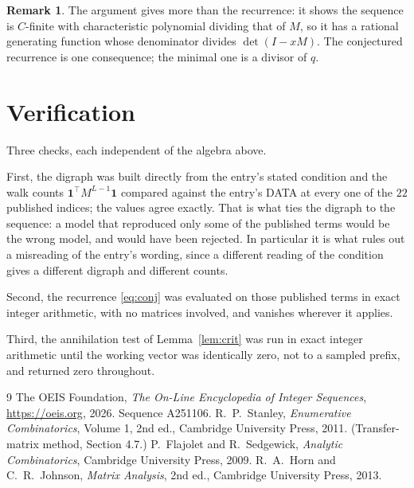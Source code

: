 \documentclass[11pt,a4paper]{article}
\theoremstyle{plain}
\theoremstyle{definition}
\newtheorem{remark}[theorem]{Remark}
\begin{document}
\begin{remark}
The argument gives more than the recurrence: it shows the sequence is $C$-finite with
characteristic polynomial dividing that of $M$, so it has a rational generating function
whose denominator divides $\det(I-xM)$. The conjectured recurrence is one consequence; the
minimal one is a divisor of $q$.
\end{remark}

\section{Verification}

Three checks, each independent of the algebra above.

First, the digraph was built directly from the entry's stated condition and the walk counts
$\mathbf{1}^{\!\top}M^{L-1}\mathbf{1}$ compared against the entry's DATA at
every one of the $22$ published indices; the values agree exactly. That is what ties
the digraph to the sequence: a model that reproduced only some of the published terms would
be the wrong model, and would have been rejected. In particular it is what rules out a
misreading of the entry's wording, since a different reading of the condition gives a
different digraph and different counts.

Second, the recurrence \eqref{eq:conj} was evaluated on those published terms in exact
integer arithmetic, with no matrices involved, and vanishes wherever it applies.

Third, the annihilation test of Lemma~\ref{lem:crit} was run in exact integer arithmetic
until the working vector was identically zero, not to a sampled prefix, and returned zero
throughout.

\begin{thebibliography}{9}
 The OEIS Foundation, \emph{The On-Line Encyclopedia of Integer
Sequences}, \url{https://oeis.org}, 2026. Sequence A251106.
 R.~P.~Stanley, \emph{Enumerative Combinatorics}, Volume 1, 2nd ed.,
Cambridge University Press, 2011. (Transfer-matrix method, Section 4.7.)
 P.~Flajolet and R.~Sedgewick, \emph{Analytic Combinatorics}, Cambridge
University Press, 2009.
 R.~A.~Horn and C.~R.~Johnson, \emph{Matrix Analysis}, 2nd ed., Cambridge
University Press, 2013.
\end{thebibliography}
\end{document}
